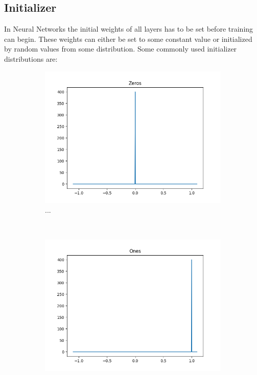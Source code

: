 \newpage

\subsection{Initializer}
In Neural Networks the initial weights of all layers has to be set before training can begin. These weights can either be set to some constant value or initialized by random values from some distribution. Some commonly used initializer distributions are:

\begin{figure}[h!]
	\centering
	\begin{subfigure}[t]{0.5\textwidth}
		\centering
		\includegraphics[width=\textwidth]{img/methodology_neuralNetwork_initializerFunctions_zeros.png}
		\caption{...}
	\end{subfigure}%
	~ 
	\begin{subfigure}[t]{0.5\textwidth}
		\centering
		\includegraphics[width=\textwidth]{img/methodology_neuralNetwork_initializerFunctions_ones.png}

\end{subfigure}
\end{figure}
